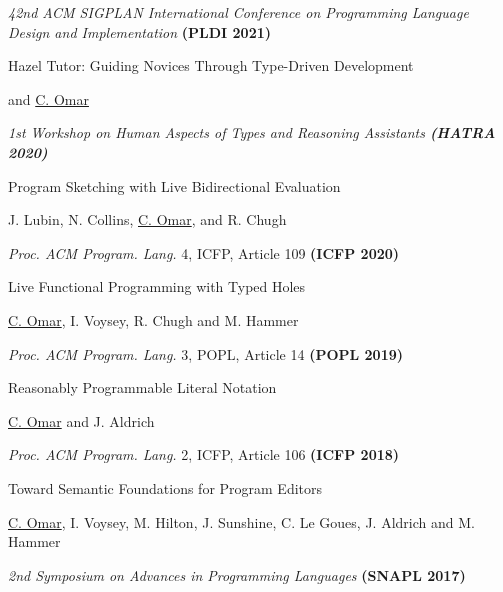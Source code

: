 \documentclass[10pt,letterpaper]{article}
\renewenvironment{itemize}{
  \begin{list}{}{
    \setlength{\leftmargin}{1.25em}
    \setlength{\itemsep}{0.25em}
    \setlength{\parskip}{0pt}
    \setlength{\parsep}{0.2em}
  }
}{
  \end{list}
}
\begin{document}
\begin{enumerate}
\begin{itemize}
          \item \textit{42nd ACM SIGPLAN International Conference on Programming Language Design and Implementation} \textbf{(PLDI 2021)}
        \end{itemize}
  \item Hazel Tutor: Guiding Novices Through Type-Driven Development
        \begin{itemize}
          \item {} and \underline{C. Omar}
          \item \textit{1st Workshop on Human Aspects of Types and Reasoning Assistants \textbf{(HATRA 2020)}}
        \end{itemize}
  \item {Program Sketching with Live Bidirectional Evaluation}
        \begin{itemize}
          \item J. Lubin, N. Collins, \underline{C. Omar}, and R. Chugh
          \item \textit{Proc. ACM Program. Lang.} 4, ICFP, Article 109 \textbf{(ICFP 2020)}
        \end{itemize}
  \item {Live Functional Programming with Typed Holes}
        \begin{itemize}
          \item \underline{C. Omar}, I. Voysey, R. Chugh and M. Hammer
          \item \textit{Proc. ACM Program. Lang.} 3, POPL, Article 14 \textbf{(POPL 2019)}
        \end{itemize}
  \item {Reasonably Programmable Literal Notation}
        \begin{itemize}
          \item \underline{C. Omar} and J. Aldrich
          \item \textit{Proc. ACM Program. Lang.} 2, ICFP, Article 106 \textbf{(ICFP 2018)}
        \end{itemize}
  \item Toward Semantic Foundations for Program Editors
        \begin{itemize}
          \item \underline{C. Omar}, I. Voysey, M. Hilton, J. Sunshine, C. Le Goues, J. Aldrich and M. Hammer
          \item \textit{2nd Symposium on Advances in Programming Languages} {\textbf{(SNAPL 2017)}}
        \end{itemize}

\end{enumerate}
\end{document}
